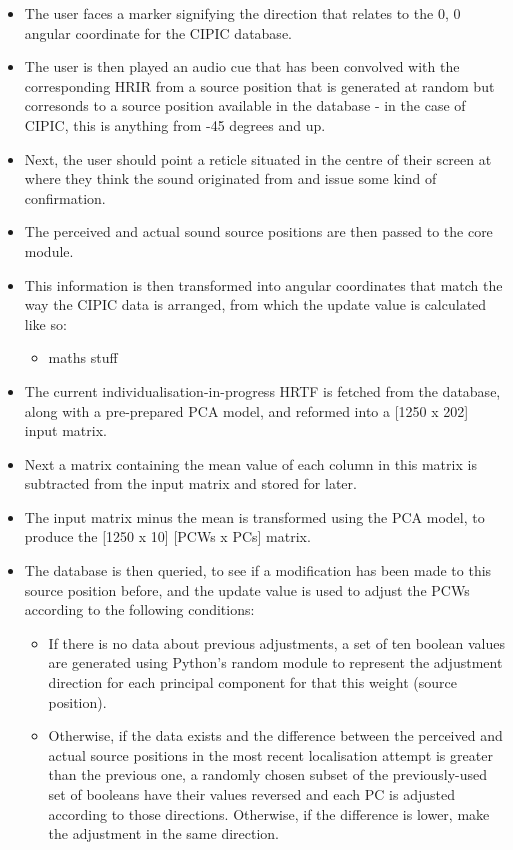 \begin{itemize}
\item The user faces a marker signifying the direction that relates to the 0, 0 angular coordinate for the CIPIC database.
\item The user is then played an audio cue that has been convolved with the corresponding HRIR from a source position that is generated at random but corresonds to a source position available in the database - in the case of CIPIC, this is anything from -45 degrees and up.
\item  Next, the user should point a reticle situated in the centre of their screen at where they think the sound originated from and issue some kind of confirmation. 
\item The perceived and actual sound source positions are then passed to the core module.
\item This information is then transformed into angular coordinates that match the way the CIPIC data is arranged, from which the update value is calculated like so:
\begin{itemize}
\item maths stuff
\end{itemize}
\item The current individualisation-in-progress HRTF is fetched from the database, along with a pre-prepared PCA model, and reformed into a [1250 x 202] input matrix. 
\item Next a matrix containing the mean value of each column in this matrix is subtracted from the input matrix and stored for later. 
\item The input matrix minus the mean is transformed using the PCA model, to produce the [1250 x 10] [PCWs x PCs] matrix. 
\item The database is then queried, to see if a modification has been made to this source position before, and the update value is used to adjust the PCWs according to the following conditions:
\begin{itemize}
\item If there is no data about previous adjustments, a set of ten boolean values are generated using Python's random module\citep{python random} to represent the adjustment direction for each principal component for that this weight (source position). 
\item Otherwise, if the data exists and the difference between the perceived and actual source positions in the most recent localisation attempt is greater than the previous one, a randomly chosen subset of the previously-used set of booleans have their values reversed and each PC is adjusted according to those directions. Otherwise, if the difference is lower, make the adjustment in the same direction. 

\end{itemize}
\end{itemize}
